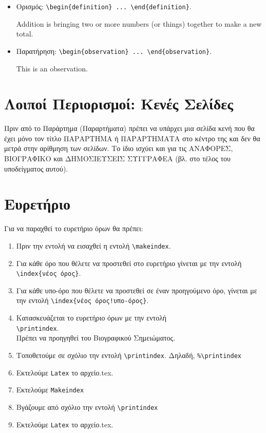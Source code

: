 \begin{itemize}
	\item Ορισμός: \verb|\begin{definition} ... \end{definition}|.

	\begin{definition}
	Addition is bringing two or more numbers (or things) together to make a new total.
	\end{definition}

	\item Παρατήρηση: \verb|\begin{observation} ... \end{observation}|.

	\begin{observation}
	This is an observation.
	\end{observation}
\end{itemize}


\section{Λοιποί Περιορισμοί: Κενές Σελίδες}
\label{sec:Restrictions}

{\color{red}
Πριν από το Παράρτημα (Παραρτήματα) πρέπει να υπάρχει μια σελίδα
κενή που θα έχει μόνο τον τίτλο ΠΑΡΑΡΤΗΜΑ ή ΠΑΡΑΡΤΗΜΑΤΑ στο κέντρο
της και δεν θα μετρά στην αρίθμηση των σελίδων.  Το ίδιο ισχύει
και για τις ΑΝΑΦΟΡΕΣ, ΒΙΟΓΡΑΦΙΚΟ και ΔΗΜΟΣΙΕΥΣΕΙΣ ΣΥΓΓΡΑΦΕΑ (βλ.
στο τέλος του υποδείγματος αυτού).}


\section{Ευρετήριο}
\label{sec:Index}

{\color{red}
Για να παραχθεί το ευρετήριο όρων θα πρέπει:

\begin{enumerate}
  \item Πριν την εντολή \verb|| να εισαχθεί η
  εντολή \verb|\makeindex|.
  \item Για κάθε όρο που θέλετε να προστεθεί στο ευρετήριο γίνεται
  με την εντολή \verb|\index{νέος όρος}|.
  \item Για κάθε υπο-όρο που θέλετε να προστεθεί σε έναν προηγούμενο όρο, γίνεται
  με την εντολή \verb|\index{νέος όρος!υπο-όρος}|.
  \item Κατασκευάζεται το ευρετήριο όρων με την εντολή\\
  \verb|\printindex|. \\Πρέπει να προηγηθεί του Βιογραφικού
  Σημειώματος.
  \item Τοποθετούμε σε σχόλιο την εντολή
  \verb|\printindex|. Δηλαδή,
  \verb|%\printindex|
  \item Εκτελούμε
  \verb|Latex| το αρχείο.tex.
  \item Εκτελούμε
  \verb|Makeindex|
  \item Βγάζουμε από σχόλιο την εντολή
  \verb|\printindex|
  \item Εκτελούμε
  \verb|Latex| το αρχείο.tex.
\end{enumerate}}


